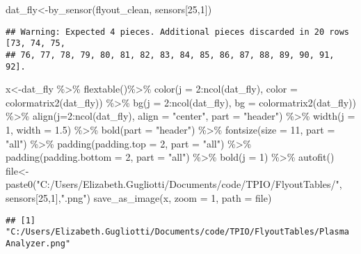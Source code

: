\documentclass[
]{article}
\newenvironment{Shaded}{\begin{snugshade}}{\end{snugshade}}
\newcommand{\AttributeTok}[1]{\textcolor[rgb]{0.77,0.63,0.00}{#1}}
\newcommand{\DecValTok}[1]{\textcolor[rgb]{0.00,0.00,0.81}{#1}}
\newcommand{\FloatTok}[1]{\textcolor[rgb]{0.00,0.00,0.81}{#1}}
\newcommand{\FunctionTok}[1]{\textcolor[rgb]{0.00,0.00,0.00}{#1}}
\newcommand{\NormalTok}[1]{#1}
\newcommand{\OtherTok}[1]{\textcolor[rgb]{0.56,0.35,0.01}{#1}}
\newcommand{\SpecialCharTok}[1]{\textcolor[rgb]{0.00,0.00,0.00}{#1}}
\newcommand{\StringTok}[1]{\textcolor[rgb]{0.31,0.60,0.02}{#1}}
\begin{document}
\begin{Shaded}
\begin{Highlighting}[]
\NormalTok{dat\_fly}\OtherTok{\textless{}{-}}\FunctionTok{by\_sensor}\NormalTok{(flyout\_clean, sensors[}\DecValTok{25}\NormalTok{,}\DecValTok{1}\NormalTok{])}
\end{Highlighting}
\end{Shaded}

\begin{verbatim}
## Warning: Expected 4 pieces. Additional pieces discarded in 20 rows [73, 74, 75,
## 76, 77, 78, 79, 80, 81, 82, 83, 84, 85, 86, 87, 88, 89, 90, 91, 92].
\end{verbatim}

\begin{Shaded}
\begin{Highlighting}[]
\NormalTok{x}\OtherTok{\textless{}{-}}\NormalTok{dat\_fly }\SpecialCharTok{\%\textgreater{}\%}
    \FunctionTok{flextable}\NormalTok{()}\SpecialCharTok{\%\textgreater{}\%}
    \FunctionTok{color}\NormalTok{(}\AttributeTok{j =} \DecValTok{2}\SpecialCharTok{:}\FunctionTok{ncol}\NormalTok{(dat\_fly), }\AttributeTok{color =} \FunctionTok{colormatrix2}\NormalTok{(dat\_fly)) }\SpecialCharTok{\%\textgreater{}\%}
    \FunctionTok{bg}\NormalTok{(}\AttributeTok{j =} \DecValTok{2}\SpecialCharTok{:}\FunctionTok{ncol}\NormalTok{(dat\_fly), }\AttributeTok{bg =} \FunctionTok{colormatrix2}\NormalTok{(dat\_fly)) }\SpecialCharTok{\%\textgreater{}\%}
    \FunctionTok{align}\NormalTok{(}\AttributeTok{j=}\DecValTok{2}\SpecialCharTok{:}\FunctionTok{ncol}\NormalTok{(dat\_fly), }\AttributeTok{align =} \StringTok{"center"}\NormalTok{, }\AttributeTok{part =} \StringTok{"header"}\NormalTok{) }\SpecialCharTok{\%\textgreater{}\%}
    \FunctionTok{width}\NormalTok{(}\AttributeTok{j =} \DecValTok{1}\NormalTok{, }\AttributeTok{width =} \FloatTok{1.5}\NormalTok{) }\SpecialCharTok{\%\textgreater{}\%}
    \FunctionTok{bold}\NormalTok{(}\AttributeTok{part =} \StringTok{"header"}\NormalTok{) }\SpecialCharTok{\%\textgreater{}\%}
    \FunctionTok{fontsize}\NormalTok{(}\AttributeTok{size =} \DecValTok{11}\NormalTok{, }\AttributeTok{part =} \StringTok{"all"}\NormalTok{) }\SpecialCharTok{\%\textgreater{}\%}
    \FunctionTok{padding}\NormalTok{(}\AttributeTok{padding.top =} \DecValTok{2}\NormalTok{, }\AttributeTok{part =} \StringTok{"all"}\NormalTok{) }\SpecialCharTok{\%\textgreater{}\%}
    \FunctionTok{padding}\NormalTok{(}\AttributeTok{padding.bottom =} \DecValTok{2}\NormalTok{, }\AttributeTok{part =} \StringTok{"all"}\NormalTok{) }\SpecialCharTok{\%\textgreater{}\%}
    \FunctionTok{bold}\NormalTok{(}\AttributeTok{j =} \DecValTok{1}\NormalTok{) }\SpecialCharTok{\%\textgreater{}\%} \FunctionTok{autofit}\NormalTok{()}
\NormalTok{file}\OtherTok{\textless{}{-}}\FunctionTok{paste0}\NormalTok{(}\StringTok{"C:/Users/Elizabeth.Gugliotti/Documents/code/TPIO/FlyoutTables/"}\NormalTok{, sensors[}\DecValTok{25}\NormalTok{,}\DecValTok{1}\NormalTok{],}\StringTok{".png"}\NormalTok{)}
\FunctionTok{save\_as\_image}\NormalTok{(x, }\AttributeTok{zoom =} \DecValTok{1}\NormalTok{, }\AttributeTok{path =}\NormalTok{ file)}
\end{Highlighting}
\end{Shaded}

\begin{verbatim}
## [1] "C:/Users/Elizabeth.Gugliotti/Documents/code/TPIO/FlyoutTables/Plasma Analyzer.png"
\end{verbatim}
\end{document}
